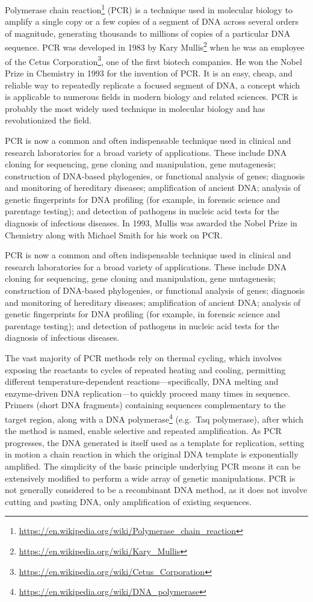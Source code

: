 \documentclass[]{book}
\let\rmarkdownfootnote\footnote%
\def\footnote{\protect\rmarkdownfootnote}
\renewcommand{\href}[2]{#2\footnote{\url{#1}}}
\theoremstyle{definition}
\theoremstyle{definition}
\theoremstyle{definition}
\theoremstyle{remark}
\begin{document}
\href{https://en.wikipedia.org/wiki/Polymerase_chain_reaction}{Polymerase
chain reaction} (PCR) is a technique used in molecular biology to
amplify a single copy or a few copies of a segment of DNA across several
orders of magnitude, generating thousands to millions of copies of a
particular DNA sequence. PCR was developed in 1983 by
\href{https://en.wikipedia.org/wiki/Kary_Mullis}{Kary Mullis} when he
was an employee of the
\href{https://en.wikipedia.org/wiki/Cetus_Corporation}{Cetus
Corporation}, one of the first biotech companies. He won the Nobel Prize
in Chemistry in 1993 for the invention of PCR. It is an easy, cheap, and
reliable way to repeatedly replicate a focused segment of DNA, a concept
which is applicable to numerous fields in modern biology and related
sciences. PCR is probably the most widely used technique in molecular
biology and has revolutionized the field.

PCR is now a common and often indispensable technique used in clinical
and research laboratories for a broad variety of applications. These
include DNA cloning for sequencing, gene cloning and manipulation, gene
mutagenesis; construction of DNA-based phylogenies, or functional
analysis of genes; diagnosis and monitoring of hereditary diseases;
amplification of ancient DNA; analysis of genetic fingerprints for DNA
profiling (for example, in forensic science and parentage testing); and
detection of pathogens in nucleic acid tests for the diagnosis of
infectious diseases. In 1993, Mullis was awarded the Nobel Prize in
Chemistry along with Michael Smith for his work on PCR.

PCR is now a common and often indispensable technique used in clinical
and research laboratories for a broad variety of applications. These
include DNA cloning for sequencing, gene cloning and manipulation, gene
mutagenesis; construction of DNA-based phylogenies, or functional
analysis of genes; diagnosis and monitoring of hereditary diseases;
amplification of ancient DNA; analysis of genetic fingerprints for DNA
profiling (for example, in forensic science and parentage testing); and
detection of pathogens in nucleic acid tests for the diagnosis of
infectious diseases.

The vast majority of PCR methods rely on thermal cycling, which involves
exposing the reactants to cycles of repeated heating and cooling,
permitting different temperature-dependent reactions---specifically, DNA
melting and enzyme-driven DNA replication---to quickly proceed many
times in sequence. Primers (short DNA fragments) containing sequences
complementary to the target region, along with a
\href{https://en.wikipedia.org/wiki/DNA_polymerase}{DNA polymerase}
(e.g.~Taq polymerase), after which the method is named, enable selective
and repeated amplification. As PCR progresses, the DNA generated is
itself used as a template for replication, setting in motion a chain
reaction in which the original DNA template is exponentially amplified.
The simplicity of the basic principle underlying PCR means it can be
extensively modified to perform a wide array of genetic manipulations.
PCR is not generally considered to be a recombinant DNA method, as it
does not involve cutting and pasting DNA, only amplification of existing
sequences.
\end{document}
